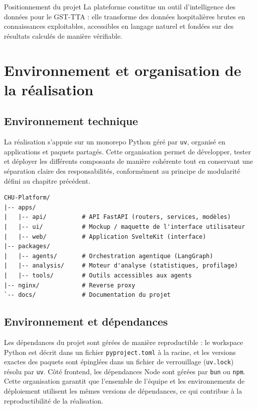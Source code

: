 \begin{infobox}{Positionnement du projet}
La plateforme constitue un outil d'intelligence des données pour le GST-TTA : elle transforme des données hospitalières brutes en connaissances exploitables, accessibles en langage naturel et fondées sur des résultats calculés de manière vérifiable.
\end{infobox}

\section{Environnement et organisation de la réalisation}

\subsection{Environnement technique}

La réalisation s'appuie sur un monorepo Python géré par \texttt{uv}, organisé en applications et paquets partagés. Cette organisation permet de développer, tester et déployer les différents composants de manière cohérente tout en conservant une séparation claire des responsabilités, conformément au principe de modularité défini au chapitre précédent.

\begin{lstlisting}[caption={Organisation du monorepo}]
CHU-Platform/
|-- apps/
|   |-- api/          # API FastAPI (routers, services, modèles)
|   |-- ui/           # Mockup / maquette de l'interface utilisateur
|   |-- web/          # Application SvelteKit (interface)
|-- packages/
|   |-- agents/       # Orchestration agentique (LangGraph)
|   |-- analysis/     # Moteur d'analyse (statistiques, profilage)
|   |-- tools/        # Outils accessibles aux agents
|-- nginx/            # Reverse proxy
`-- docs/             # Documentation du projet
\end{lstlisting}

\subsection{Environnement et dépendances}

Les dépendances du projet sont gérées de manière reproductible : le workspace Python est décrit dans un fichier \texttt{pyproject.toml} à la racine, et les versions exactes des paquets sont épinglées dans un fichier de verrouillage (\texttt{uv.lock}) résolu par \texttt{uv}. Côté frontend, les dépendances Node sont gérées par \texttt{bun} ou \texttt{npm}. Cette organisation garantit que l'ensemble de l'équipe et les environnements de déploiement utilisent les mêmes versions de dépendances, ce qui contribue à la reproductibilité de la réalisation.

